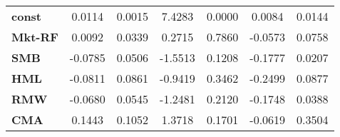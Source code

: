 \begin{center}
\begin{tabular}{lcccccc}
\midrule
\textbf{const}  &       0.0114       &       0.0015       &      7.4283     &      0.0000      &       0.0084      &       0.0144       \\
\textbf{Mkt-RF} &       0.0092       &       0.0339       &      0.2715     &      0.7860      &      -0.0573      &       0.0758       \\
\textbf{SMB}    &      -0.0785       &       0.0506       &     -1.5513     &      0.1208      &      -0.1777      &       0.0207       \\
\textbf{HML}    &      -0.0811       &       0.0861       &     -0.9419     &      0.3462      &      -0.2499      &       0.0877       \\
\textbf{RMW}    &      -0.0680       &       0.0545       &     -1.2481     &      0.2120      &      -0.1748      &       0.0388       \\
\textbf{CMA}    &       0.1443       &       0.1052       &      1.3718     &      0.1701      &      -0.0619      &       0.3504       \\
\bottomrule
\end{tabular}
\end{center}
